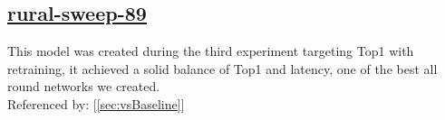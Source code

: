 \documentclass[11pt]{report}
\begin{document}
\subsection*{\protect\href{https://wandb.ai/samfh/Resnet56-Channels-Filters/runs/drh6012i/overview?workspace=}{\underline{\color{blue}rural-sweep-89}}}\label{sec:rural-sweep-89}
This model was created during the third experiment targeting Top1 with retraining, it achieved a solid balance of Top1 and latency, one of the best all round networks we created.\\
Referenced by: [\ref{sec:vsBaseline}]
\begin{figure}[H]
    \begin{table}[H]
        \centering
        \hspace{2em}
    \end{table}    
\end{figure}
\end{document}
